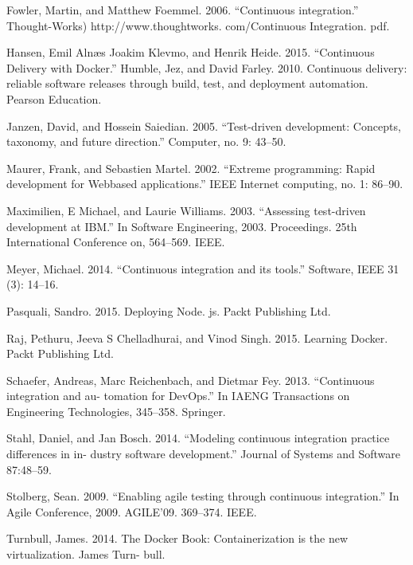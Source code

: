 Fowler, Martin, and Matthew Foemmel. 2006. “Continuous integration.” Thought-Works) http://www.thoughtworks. com/Continuous Integration. pdf.

Hansen, Emil Alnæs Joakim Klevmo, and Henrik Heide. 2015. “Continuous Delivery with Docker.” Humble, Jez, and David Farley. 2010. Continuous delivery: reliable software releases through build, test, and deployment automation. Pearson Education.

Janzen, David, and Hossein Saiedian. 2005. “Test-driven development: Concepts, taxonomy, and future direction.” Computer, no. 9: 43–50.

Maurer, Frank, and Sebastien Martel. 2002. “Extreme programming: Rapid development for Webbased applications.” IEEE Internet computing, no. 1: 86–90.

Maximilien, E Michael, and Laurie Williams. 2003. “Assessing test-driven development at IBM.” In Software Engineering, 2003. Proceedings. 25th International Conference on, 564–569. IEEE.

Meyer, Michael. 2014. “Continuous integration and its tools.” Software, IEEE 31 (3): 14–16.

Pasquali, Sandro. 2015. Deploying Node. js. Packt Publishing Ltd.

Raj, Pethuru, Jeeva S Chelladhurai, and Vinod Singh. 2015. Learning Docker. Packt Publishing Ltd.

Schaefer, Andreas, Marc Reichenbach, and Dietmar Fey. 2013. “Continuous integration and au- tomation for DevOps.” In IAENG Transactions on Engineering Technologies, 345–358. Springer.

Stahl, Daniel, and Jan Bosch. 2014. “Modeling continuous integration practice differences in in- dustry software development.” Journal of Systems and Software 87:48–59.

Stolberg, Sean. 2009. “Enabling agile testing through continuous integration.” In Agile Conference, 2009. AGILE’09. 369–374. IEEE.

Turnbull, James. 2014. The Docker Book: Containerization is the new virtualization. James Turn- bull.

\newpage
